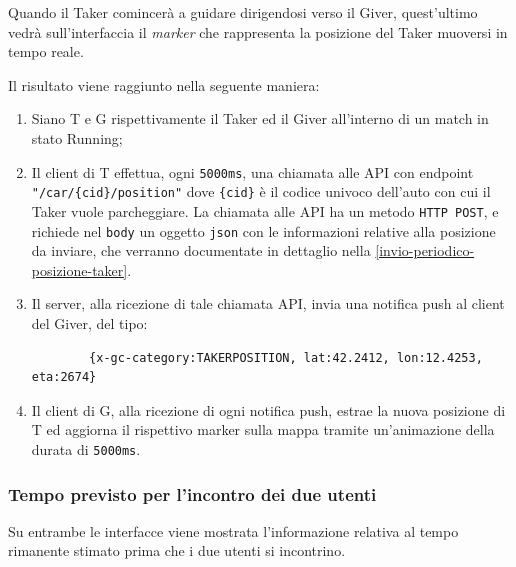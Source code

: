 Quando il Taker comincerà a guidare dirigendosi verso il
Giver, quest'ultimo vedrà sull'interfaccia il \emph{marker} che rappresenta la posizione del Taker muoversi in tempo reale.

Il risultato viene raggiunto nella seguente maniera:

\begin{enumerate}      
    \item Siano T e G rispettivamente il Taker ed il Giver all'interno di un match in stato Running;      
    \item Il client di T effettua, ogni \texttt{5000ms}, una chiamata alle API con endpoint \texttt{"/car/\{cid\}/position"} dove \texttt{\{cid\}} è il codice univoco dell'auto con cui il Taker vuole parcheggiare. La chiamata alle API ha un metodo \texttt{HTTP POST}, e richiede nel \texttt{body} un oggetto \texttt{json} con le informazioni relative alla posizione da inviare, che verranno documentate in dettaglio nella \autoref{invio-periodico-posizione-taker}.      
    \item Il server, alla ricezione di tale chiamata API, invia una notifica push al client del Giver, del tipo: 
        \begin{verbatim}  
        {x-gc-category:TAKERPOSITION, lat:42.2412, lon:12.4253, eta:2674}  
        \end{verbatim}      
    \item Il client di G, alla ricezione di ogni notifica push, estrae la nuova posizione di T ed aggiorna il rispettivo marker sulla mappa tramite un'animazione della durata di \texttt{5000ms}. 
\end{enumerate}

\hypertarget{tempo-previsto-per-larrivo-del-taker}{%
\subsubsection{Tempo previsto per l'incontro dei due utenti}\label{tempo-previsto-per-larrivo-del-taker}}

Su entrambe le interfacce viene mostrata l'informazione relativa al tempo rimanente stimato prima che i due utenti si incontrino.

